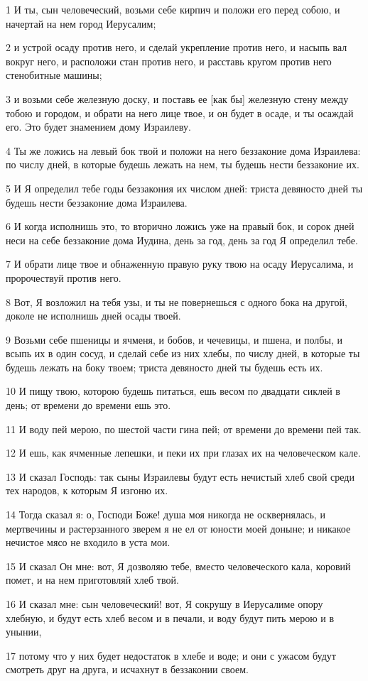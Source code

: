 \par 1 И ты, сын человеческий, возьми себе кирпич и положи его перед собою, и начертай на нем город Иерусалим;
\par 2 и устрой осаду против него, и сделай укрепление против него, и насыпь вал вокруг него, и расположи стан против него, и расставь кругом против него стенобитные машины;
\par 3 и возьми себе железную доску, и поставь ее [как бы] железную стену между тобою и городом, и обрати на него лице твое, и он будет в осаде, и ты осаждай его. Это будет знамением дому Израилеву.
\par 4 Ты же ложись на левый бок твой и положи на него беззаконие дома Израилева: по числу дней, в которые будешь лежать на нем, ты будешь нести беззаконие их.
\par 5 И Я определил тебе годы беззакония их числом дней: триста девяносто дней ты будешь нести беззаконие дома Израилева.
\par 6 И когда исполнишь это, то вторично ложись уже на правый бок, и сорок дней неси на себе беззаконие дома Иудина, день за год, день за год Я определил тебе.
\par 7 И обрати лице твое и обнаженную правую руку твою на осаду Иерусалима, и пророчествуй против него.
\par 8 Вот, Я возложил на тебя узы, и ты не повернешься с одного бока на другой, доколе не исполнишь дней осады твоей.
\par 9 Возьми себе пшеницы и ячменя, и бобов, и чечевицы, и пшена, и полбы, и всыпь их в один сосуд, и сделай себе из них хлебы, по числу дней, в которые ты будешь лежать на боку твоем; триста девяносто дней ты будешь есть их.
\par 10 И пищу твою, которою будешь питаться, ешь весом по двадцати сиклей в день; от времени до времени ешь это.
\par 11 И воду пей мерою, по шестой части гина пей; от времени до времени пей так.
\par 12 И ешь, как ячменные лепешки, и пеки их при глазах их на человеческом кале.
\par 13 И сказал Господь: так сыны Израилевы будут есть нечистый хлеб свой среди тех народов, к которым Я изгоню их.
\par 14 Тогда сказал я: о, Господи Боже! душа моя никогда не осквернялась, и мертвечины и растерзанного зверем я не ел от юности моей доныне; и никакое нечистое мясо не входило в уста мои.
\par 15 И сказал Он мне: вот, Я дозволяю тебе, вместо человеческого кала, коровий помет, и на нем приготовляй хлеб твой.
\par 16 И сказал мне: сын человеческий! вот, Я сокрушу в Иерусалиме опору хлебную, и будут есть хлеб весом и в печали, и воду будут пить мерою и в унынии,
\par 17 потому что у них будет недостаток в хлебе и воде; и они с ужасом будут смотреть друг на друга, и исчахнут в беззаконии своем.

